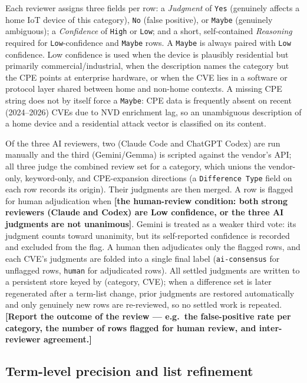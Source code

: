 \documentclass[conference]{IEEEtran}
\newcommand{\stub}[1][?]{{\color{red}\textbf{[#1]}}}
\begin{document}
Each reviewer assigns three fields per row: a \emph{Judgment} of \texttt{Yes}
(genuinely affects a home IoT device of this category), \texttt{No} (false
positive), or \texttt{Maybe} (genuinely ambiguous); a \emph{Confidence} of
\texttt{High} or \texttt{Low}; and a short, self-contained \emph{Reasoning}
required for \texttt{Low}-confidence and \texttt{Maybe} rows. A \texttt{Maybe} is
always paired with \texttt{Low} confidence. Low confidence is used when the device
is plausibly residential but primarily commercial/industrial, when the description
names the category but the CPE points at enterprise hardware, or when the CVE lies
in a software or protocol layer shared between home and non-home contexts. A
missing CPE string does not by itself force a \texttt{Maybe}: CPE data is
frequently absent on recent (2024--2026) CVEs due to NVD enrichment lag, so an
unambiguous description of a home device and a residential attack vector is
classified on its content.

Of the three AI reviewers, two (Claude Code and ChatGPT Codex) are run manually and
the third (Gemini/Gemma) is scripted against the vendor's API; all three judge the
combined review set for a category, which unions the vendor-only, keyword-only, and
CPE-expansion directions (a \texttt{Difference Type} field on each row records its
origin). Their judgments are then merged. A row is flagged for human adjudication
when \stub[the human-review condition: both strong reviewers (Claude and Codex) are
Low confidence, or the three AI judgments are not unanimous]. Gemini is treated as a
weaker third vote: its judgment counts toward unanimity, but its self-reported
confidence is recorded and excluded from the flag. A human then adjudicates only the
flagged rows, and each CVE's judgments are folded into a single final label
(\texttt{ai-consensus} for unflagged rows, \texttt{human} for adjudicated rows). All
settled judgments are written to a persistent store keyed by (category, CVE); when a
difference set is later regenerated after a term-list change, prior judgments are
restored automatically and only genuinely new rows are re-reviewed, so no settled
work is repeated. \stub[Report the outcome of the review --- e.g.\ the false-positive
rate per category, the number of rows flagged for human review, and inter-reviewer
agreement.]

\subsection{Term-level precision and list refinement}
\label{sec:method-precision}
\end{document}
